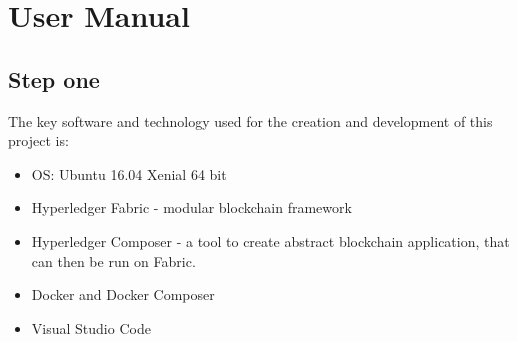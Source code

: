 \documentclass[a4paper,11pt]{report}
\begin{document}
\appendix

\chapter{User Manual}
\label{usermanual}


\section{Step one}
\label{stepOne}
	 
The key software and technology used for the creation and development of this project is:
\begin{itemize}
\item OS: Ubuntu 16.04 Xenial 64 bit
\item Hyperledger Fabric - modular blockchain framework
\item Hyperledger Composer - a tool to create abstract blockchain application, that can then be run on Fabric.
\item Docker and Docker Composer
\item Visual Studio Code
\end{itemize}
\end{document}
